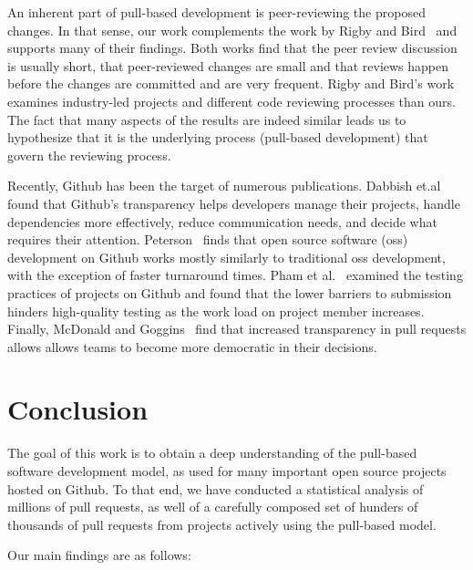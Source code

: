 \documentclass{sig-alternate}
\begin{document}
An inherent part of pull-based development is peer-reviewing the proposed
changes. In that sense, our work complements the work by Rigby and
Bird~\cite{Rigby13} and supports many of their findings. Both works find that
the peer review discussion is usually short, that peer-reviewed changes are
small and that reviews happen before the changes are committed and are very
frequent. Rigby and Bird's work examines industry-led projects and different
code reviewing processes than ours. The fact that many aspects of the results
are indeed similar leads us to hypothesize that it is the underlying
process (pull-based development) that govern the reviewing process.

Recently, Github has been the target of numerous publications. Dabbish
et.al~\cite{Dabbi13} found that Github's transparency helps developers manage
their projects, handle dependencies more effectively, reduce communication
needs, and decide what requires their attention. Peterson~\cite{Peter13}
finds that open source software ({\sc oss}) development on Github works mostly
similarly to traditional {\sc oss} development, with the exception of faster
turnaround times. Pham et al.~\cite{Pham13} examined the testing practices of
projects on Github and found that the lower barriers to submission hinders
high-quality testing as the work load on project member increases.  
Finally, McDonald and Goggins~\cite{McDon13} find that increased transparency in pull
requests allows allows teams to become more democratic in their decisions. 

\section{Conclusion}

The goal of this work is to obtain a deep understanding of the pull-based software development model, as used for many important open source projects hosted on Github. To that end, we have conducted a statistical analysis of millions of pull requests, as well of a carefully composed set of hunders of thousands of pull requests from projects actively using the pull-based model.

Our main findings are as follows:
\end{document}
